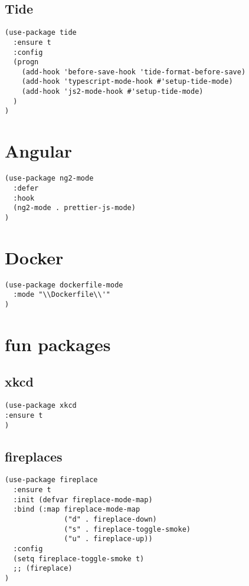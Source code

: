 \documentclass[11pt]{article}
\begin{document}
\subsection*{Tide}
\label{sec:org37b014d}
\begin{verbatim}
(use-package tide
  :ensure t
  :config
  (progn
    (add-hook 'before-save-hook 'tide-format-before-save)
    (add-hook 'typescript-mode-hook #'setup-tide-mode)
    (add-hook 'js2-mode-hook #'setup-tide-mode)
  )
)

\end{verbatim}

\section*{Angular}
\label{sec:org00ce184}
\begin{verbatim}
(use-package ng2-mode
  :defer
  :hook
  (ng2-mode . prettier-js-mode)
)
\end{verbatim}

\section*{Docker}
\label{sec:org9682473}

\begin{verbatim}
(use-package dockerfile-mode
  :mode "\\Dockerfile\\'"
)
\end{verbatim}


\section*{fun packages}
\label{sec:org20398ad}

\subsection*{xkcd}
\label{sec:orgc98f017}

\begin{verbatim}
(use-package xkcd
:ensure t
)
\end{verbatim}

\subsection*{fireplaces}
\label{sec:org8d0d17d}

\begin{verbatim}
(use-package fireplace
  :ensure t
  :init (defvar fireplace-mode-map)
  :bind (:map fireplace-mode-map
              ("d" . fireplace-down)
              ("s" . fireplace-toggle-smoke)
              ("u" . fireplace-up))
  :config
  (setq fireplace-toggle-smoke t)
  ;; (fireplace)
)
\end{verbatim}
\end{document}
